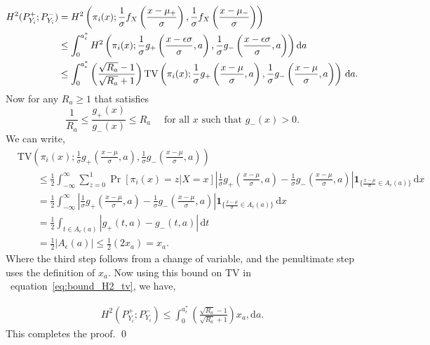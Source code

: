 \documentclass[10pt]{article} %
\def\eqref#1{equation~\ref{#1}}
\theoremstyle{plain}
\theoremstyle{definition}
\theoremstyle{remark}
\newcommand{\dx}{\mathrm{d}}
\newcommand{\TV}{\mathrm{TV}}
\begin{document}
\begin{align}
H^2(P_{Y_i}^+;P_{Y_i}^-)&= H^2\left( \pi_{i}(x) ; \frac{1}{\sigma} f_X\left(\frac{x- \mu_+}{\sigma}\right), \frac{1}{\sigma}f_X\left(\frac{x -  \mu_- }{\sigma}\right)\right) \notag\\
&\leq    \int_{0}^{a^{*}_{\epsilon}} H^2\left(\pi_i(x); \frac{1}{\sigma} g_+\left(\frac{x- \epsilon \sigma}{\sigma}, a\right),  \frac{1}{\sigma} g_-\left(\frac{x- \epsilon \sigma}{\sigma}, a\right)\right) \dx a \notag\\ 
&  \leq    \int_{0}^{a^{*}_{\epsilon}}  \left(\frac{\sqrt{R_a} - 1}{\sqrt{R_a} + 1} \right) \TV\left(\pi_i(x);  \frac{1}{\sigma}g_+\left(\frac{x-\mu}{\sigma}, a\right), \frac{1}{\sigma}g_-\left(\frac{x-\mu}{\sigma}, a\right)\right) \, \dx a. 
\label{eq:bound_H2_tv}
\end{align}
Now for any $R_a \geq 1$ that satisfies
\[
 \frac{1}{R_a} \leq \frac{g_+(x)}{g_-(x)} \leq R_a \quad \text{ for all } x \text{ such that } g_-(x) > 0 .
\]
We can write,
\begin{align*}
&\TV\left(\pi_i(x);  \frac{1}{\sigma}g_+\left(\frac{x-\mu}{\sigma}, a\right), \frac{1}{\sigma}g_-\left(\frac{x-\mu}{\sigma}, a\right)\right) \,\\
&\qquad \leq \frac{1}{2} \int_{-\infty}^\infty\sum_{z=0}^1 \Pr[\pi_i(x) = z|X=x] 
\left| \frac{1}{\sigma} g_+\left(\frac{x - \mu}{\sigma}, a\right) - \frac{1}{\sigma} g_-\left(\frac{x - \mu}{\sigma}, a\right) \right| \boldsymbol{1}_{\{\frac{x-\mu}{\sigma}\in A_\epsilon(a)\}} \, \dx x \\
&\qquad= \frac{1}{2} \int_{-\infty}^\infty 
\left| \frac{1}{\sigma} g_+\left(\frac{x - \mu}{\sigma}, a\right) - \frac{1}{\sigma} g_-\left(\frac{x - \mu}{\sigma}, a\right) \right|\boldsymbol{1}_{\{\frac{x-\mu}{\sigma}\in A_\epsilon(a)\}} \, \dx x \\
&\qquad = \frac{1}{2} \int_{t \in A_\epsilon(a)} 
\left|  g_+\left(t, a\right) -  g_-\left(t, a\right) \right| \, \dx t \\
&\qquad = \frac{1}{2}  |A_\epsilon(a)| 
\leq \frac{1}{2} (2 x_a) 
=  x_a.
\end{align*}
Where the third step follows from a change of variable, and the penultimate step uses the definition of $x_a$.
Now using this bound on \(\TV\) in ~\eqref{eq:bound_H2_tv}, we have,

\begin{align}
H^2(P_{Y_i}^+;P_{Y_i}^-) \leq    \int_{0}^{a^{*}_{\epsilon}}  \left(\frac{\sqrt{R_a} - 1}{\sqrt{R_a} + 1} \right) x_a, \dx a. 
\end{align}
This completes the proof.
\qed
\end{document}
